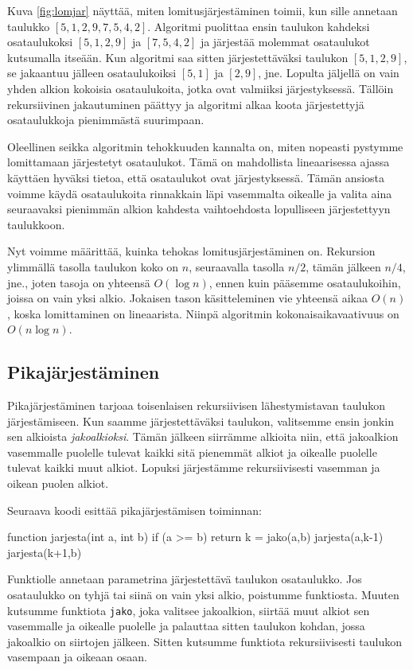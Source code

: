 Kuva \ref{fig:lomjar} näyttää, miten lomitusjärjestäminen
toimii, kun sille annetaan taulukko $[5,1,2,9,7,5,4,2]$.
Algoritmi puolittaa ensin taulukon kahdeksi osataulukoksi
$[5,1,2,9]$ ja $[7,5,4,2]$ ja järjestää molemmat
osataulukot kutsumalla itseään.
Kun algoritmi saa sitten järjestettäväksi taulukon $[5,1,2,9]$,
se jakaantuu jälleen osataulukoiksi $[5,1]$ ja $[2,9]$, jne.
Lopulta jäljellä on vain yhden alkion kokoisia
osataulukoita, jotka ovat valmiiksi järjestyksessä.
Tällöin rekursiivinen jakautuminen päättyy ja algoritmi
alkaa koota järjestettyjä osataulukkoja pienimmästä suurimpaan.

Oleellinen seikka algoritmin tehokkuuden kannalta on,
miten nopeasti pystymme lomittamaan järjestetyt osataulukot.
Tämä on mahdollista lineaarisessa ajassa käyttäen hyväksi tietoa,
että osataulukot ovat järjestyksessä.
Tämän ansiosta voimme käydä osataulukoita rinnakkain läpi
vasemmalta oikealle ja valita aina seuraavaksi pienimmän alkion
kahdesta vaihtoehdosta lopulliseen järjestettyyn taulukkoon.

Nyt voimme määrittää, kuinka tehokas lomitusjärjestäminen on.
Rekursion ylimmällä tasolla taulukon koko on $n$,
seuraavalla tasolla $n/2$, tämän jälkeen $n/4$, jne.,
joten tasoja on yhteensä $O(\log n)$, ennen kuin pääsemme
osataulukoihin, joissa on vain yksi alkio.
Jokaisen tason käsitteleminen vie yhteensä aikaa $O(n)$,
koska lomittaminen on lineaarista.
Niinpä algoritmin kokonaisaikavaativuus on $O(n \log n)$.

\subsection{Pikajärjestäminen}

Pikajärjestäminen tarjoaa toisenlaisen rekursiivisen
lähestymistavan taulukon järjestämiseen.
Kun saamme järjestettäväksi taulukon, valitsemme ensin jonkin
sen alkioista \emph{jakoalkioksi}.
Tämän jälkeen siirrämme alkioita niin,
että jakoalkion vasemmalle puolelle tulevat kaikki sitä pienemmät alkiot
ja oikealle puolelle tulevat kaikki muut alkiot.
Lopuksi järjestämme rekursiivisesti vasemman ja oikean puolen alkiot.

Seuraava koodi esittää pikajärjestämisen toiminnan:

\begin{code}
function jarjesta(int a, int b)
    if (a >= b)
        return
    k = jako(a,b)
    jarjesta(a,k-1)
    jarjesta(k+1,b)
\end{code}

Funktiolle annetaan parametrina järjestettävä
taulukon osataulukko.
Jos osataulukko on tyhjä tai siinä on vain yksi alkio,
poistumme funktiosta.
Muuten kutsumme funktiota \texttt{jako}, joka valitsee jakoalkion,
siirtää muut alkiot sen vasemmalle ja oikealle puolelle
ja palauttaa sitten taulukon kohdan, jossa jakoalkio on siirtojen jälkeen.
Sitten kutsumme funktiota rekursiivisesti
taulukon vasempaan ja oikeaan osaan.

